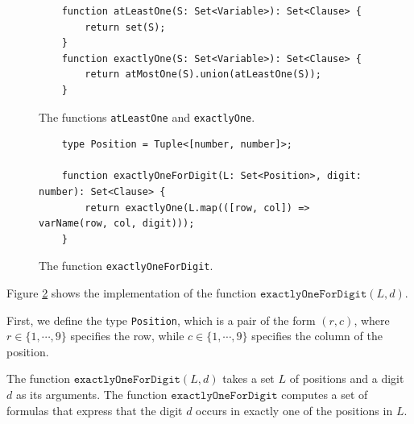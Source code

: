 \begin{figure}[!ht]
\centering
\begin{verbatim}
    function atLeastOne(S: Set<Variable>): Set<Clause> {
        return set(S);
    }
    function exactlyOne(S: Set<Variable>): Set<Clause> {
        return atMostOne(S).union(atLeastOne(S));
    }
\end{verbatim}
\vspace*{-0.3cm}
\caption{The functions \texttt{atLeastOne} and \texttt{exactlyOne}.}
\label{fig:sudoku-exactly}
\end{figure}



\begin{figure}[!ht]
\centering
\begin{verbatim}
    type Position = Tuple<[number, number]>;
               
    function exactlyOneForDigit(L: Set<Position>, digit: number): Set<Clause> {
        return exactlyOne(L.map(([row, col]) => varName(row, col, digit)));
    }
\end{verbatim}
\vspace*{-0.3cm}
\caption{The function \texttt{exactlyOneForDigit}.}
\label{fig:sudoku-exactlyOneForDigit}
\end{figure}

Figure \ref{fig:sudoku-exactlyOneForDigit} shows the implementation of the function
$\texttt{exactlyOneForDigit}(L, d)$.

First, we define the type \texttt{Position}, which is a pair of the form $(r, c)$, where $r \in \{1,\cdots,9\}$
specifies the row, while $c \in \{1,\cdots,9\}$ specifies the column of the position.

The function $\texttt{exactlyOneForDigit}(L, d)$ takes a set $L$ of positions and a digit $d$ as its arguments.
The function $\texttt{exactlyOneForDigit}$ computes a set of formulas that express that the digit $d$ 
occurs in exactly one of the positions in $L$.



